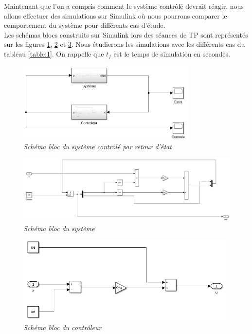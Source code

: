 \documentclass[11pt,french]{article} %
\begin{document}
Maintenant que l'on a compris comment le système contrôlé devrait réagir, nous allons effectuer des simulations sur Simulink où nous pourrons comparer le comportement du système pour différents cas d'étude. \\

Les schémas blocs construits sur Simulink lors des séances de TP sont représentés sur les figures \ref{fig:simulink_controle_pend_inv}, \ref{fig:systeme_pend_inv} et \ref{fig:controle_pend_inv}. Nous étudierons les simulations avec les différents cas du tableau \ref{table:1}. On rappelle que $t_f$ est le temps de simulation en secondes. \\

\begin{figure}[H]
    \centering
    \includegraphics[width=9cm]{simulink_controle_pend_inv.png} 
		\caption{\textit{Schéma bloc du système contrôlé par retour d'état}}
		\label{fig:simulink_controle_pend_inv}
\end{figure}
\vspace{2cm}

\begin{figure}[H]
    \centering
		\advance\leftskip-2cm
    \includegraphics[width=19cm]{systeme_pend_inv.png} 
		\caption{\textit{Schéma bloc du système}}
		\label{fig:systeme_pend_inv}
\end{figure}
\vspace{0.5cm}

\begin{figure}[H]
    \centering
    \includegraphics[width=11cm]{controle_pend_inv.png} 
		\caption{\textit{Schéma bloc du contrôleur}}
		\label{fig:controle_pend_inv}
\end{figure}
\vspace{0.5cm}
\end{document}
